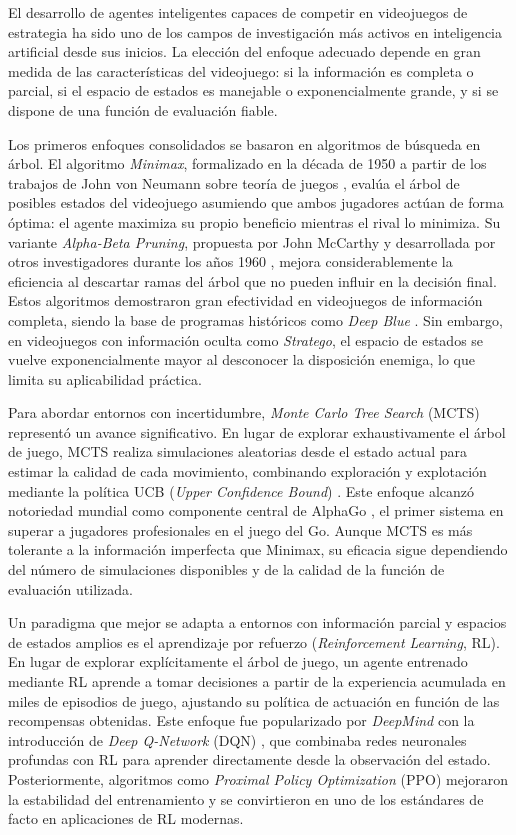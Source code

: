 El desarrollo de agentes inteligentes capaces de competir en videojuegos de estrategia ha sido uno de los campos de investigación más activos en inteligencia artificial desde sus inicios. La elección del enfoque adecuado depende en gran medida de las características del videojuego: si la información es completa o parcial, si el espacio de estados es manejable o exponencialmente grande, y si se dispone de una función de evaluación fiable.

Los primeros enfoques consolidados se basaron en algoritmos de búsqueda en árbol. El algoritmo \textit{Minimax}, formalizado en la década de 1950 a partir de los trabajos de John von Neumann sobre teoría de juegos \cite{vonNeumann1944}, evalúa el árbol de posibles estados del videojuego asumiendo que ambos jugadores actúan de forma óptima: el agente maximiza su propio beneficio mientras el rival lo minimiza. Su variante \textit{Alpha-Beta Pruning}, propuesta por John McCarthy y desarrollada por otros investigadores durante los años 1960 \cite{Knuth1975}, mejora considerablemente la eficiencia al descartar ramas del árbol que no pueden influir en la decisión final. Estos algoritmos demostraron gran efectividad en videojuegos de información completa, siendo la base de programas históricos como \textit{Deep Blue} \cite{Campbell2002}. Sin embargo, en videojuegos con información oculta como \textit{Stratego}, el espacio de estados se vuelve exponencialmente mayor al desconocer la disposición enemiga, lo que limita su aplicabilidad práctica.

Para abordar entornos con incertidumbre, \textit{Monte Carlo Tree Search} (MCTS) representó un avance significativo. En lugar de explorar exhaustivamente el árbol de juego, MCTS realiza simulaciones aleatorias desde el estado actual para estimar la calidad de cada movimiento, combinando exploración y explotación mediante la política UCB (\textit{Upper Confidence Bound}) \cite{Coulom2006}. Este enfoque alcanzó notoriedad mundial como componente central de AlphaGo \cite{Silver2016}, el primer sistema en superar a jugadores profesionales en el juego del Go. Aunque MCTS es más tolerante a la información imperfecta que Minimax, su eficacia sigue dependiendo del número de simulaciones disponibles y de la calidad de la función de evaluación utilizada.

Un paradigma que mejor se adapta a entornos con información parcial y espacios de estados amplios es el aprendizaje por refuerzo (\textit{Reinforcement Learning}, RL). En lugar de explorar explícitamente el árbol de juego, un agente entrenado mediante RL aprende a tomar decisiones a partir de la experiencia acumulada en miles de episodios de juego, ajustando su política de actuación en función de las recompensas obtenidas. Este enfoque fue popularizado por \textit{DeepMind} con la introducción de \textit{Deep Q-Network} (DQN) \cite{Mnih2015}, que combinaba redes neuronales profundas con RL para aprender directamente desde la observación del estado. Posteriormente, algoritmos como \textit{Proximal Policy Optimization} (PPO) \cite{Schulman2017} mejoraron la estabilidad del entrenamiento y se convirtieron en uno de los estándares de facto en aplicaciones de RL modernas.

